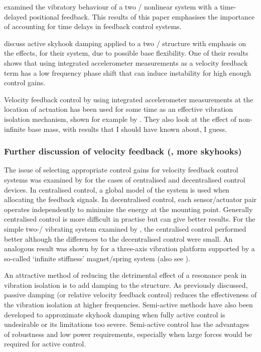 \textcite{zhao2007} examined the vibratory behaviour of a two \dof/ nonlinear system with a time-delayed positional feedback.
This results of this paper emphasises the importance of accounting for time delays in feedback control systems.

\textcite{serrand2000} discuss active skyhook damping applied to a two \dof/ structure with emphasis on the effects, for their system, due to possible base flexibility.
One of their results shows that using integrated accelerometer measurements as a velocity feedback term has a low frequency phase shift that can induce instability for high enough control gains.

Velocity feedback control by using integrated accelerometer measurements at the location of actuation has been used for some time as an effective vibration isolation mechanism, shown for example by \textcite{kim1999}.
They also look at the effect of non-infinite base mass, with results that I should have known about, I guess.


\subsubsection{Further discussion of velocity feedback (\ie, more skyhooks)}

The issue of selecting appropriate control gains for velocity feedback control systems was examined by \textcite{engels2008} for the cases of centralised and decentralised control devices.
In centralised control, a global model of the system is used when allocating the feedback signals.
In decentralised control, each sensor/actuator pair operates independently to minimize the energy at the mounting point.
Generally centralised control is more difficult in practise but can give better results.
For the simple two-\dof/ vibrating system examined by \textcite{engels2008}, the centralised control performed better although the differences to the decentralised control were small.
An analogous result was shown by \textcite{hoque2006} for a three-axis vibration platform supported by a so-called `infinite stiffness' magnet/spring system (also see ).

An attractive method of reducing the detrimental effect of a resonance peak in vibration isolation is to add damping to the structure. As previously discussed, passive damping (or relative velocity feedback control) reduces the effectiveness of the vibration isolation at higher frequencies.
Semi-active methods have also been developed to approximate skyhook damping when fully active control is undesirable \cite{liu2002,liu2005,ahmadian2004} or its limitations too severe.
Semi-active control has the advantages of robustness and low power requirements, especially when large forces would be required for active control.

